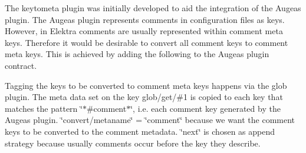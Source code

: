 The keytometa plugin was initially developed to aid the integration of the Augeas plugin. The Augeas plugin represents comments in configuration files as keys. However, in Elektra comments are usually represented within comment meta keys. Therefore it would be desirable to convert all comment keys to comment meta keys. This is achieved by adding the following to the Augeas plugin contract. 


Tagging the keys to be converted to comment meta keys happens via the glob plugin. The meta data set on the key {\ttfamily glob/get/\#1} is copied to each key that matches the pattern \char`\"{}$\ast$\#comment$\ast$\char`\"{}, i.\+e. each comment key generated by the Augeas plugin. \char`\"{}convert/metaname\char`\"{} = \char`\"{}comment\char`\"{} because we want the comment keys to be converted to the comment metadata. \char`\"{}next\char`\"{} is chosen as append strategy because usually comments occur before the key they describe. 